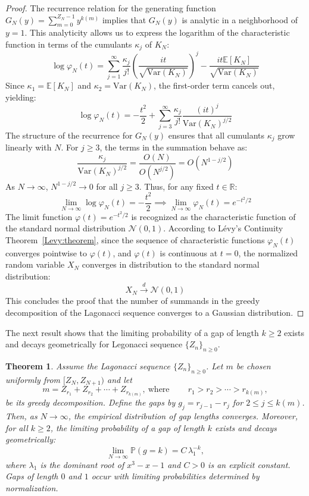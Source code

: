 \documentclass[11pt]{amsart}
\theoremstyle{plain}
\numberwithin{equation}{section} %
\newtheorem{theorem}[thm]{Theorem}
\numberwithin{table}{section} %
\numberwithin{figure}{section}
\begin{document}
\begin{proof}
		The recurrence relation for the generating function $G_N(y) = \sum_{m=0}^{Z_N-1} y^{k(m)}$ implies that $G_N(y)$ is analytic in a neighborhood of $y=1$. This analyticity allows us to express the logarithm of the characteristic function in terms of the cumulants $\kappa_j$ of $K_N$:
		\[
		\log \varphi_N(t) = \sum_{j=1}^{\infty} \frac{\kappa_j}{j!} \left( \frac{it}{\sqrt{\text{Var}(K_N)}} \right)^j - \frac{it\mathbb{E}[K_N]}{\sqrt{\text{Var}(K_N)}}
		\]
		Since $\kappa_1 = \mathbb{E}[K_N]$ and $\kappa_2 = \text{Var}(K_N)$, the first-order term cancels out, yielding:
		\[
		\log \varphi_N(t) = -\frac{t^2}{2} + \sum_{j=3}^{\infty} \frac{\kappa_j}{j!} \frac{(it)^j}{\text{Var}(K_N)^{j/2}}
		\]
		The structure of the recurrence for $G_N(y)$ ensures that all cumulants $\kappa_j$ grow linearly with $N$. For $j \geq 3$, the terms in the summation behave as:
		\[
		\frac{\kappa_j}{\text{Var}(K_N)^{j/2}} = \frac{O(N)}{O(N^{j/2})} = O(N^{1-j/2})
		\]
		As $N \to \infty$, $N^{1-j/2} \to 0$ for all $j \geq 3$. Thus, for any fixed $t \in \mathbb{R}$:
		\[
		\lim_{N \to \infty} \log \varphi_N(t) = -\frac{t^2}{2} \implies \lim_{N \to \infty} \varphi_N(t) = e^{-t^2/2}
		\]
		The limit function $\varphi(t) = e^{-t^2/2}$ is recognized as the characteristic function of the standard normal distribution $\mathcal{N}(0,1)$. According to Lévy's Continuity Theorem~\ref{Levy:theorem}, since the sequence of characteristic functions $\varphi_N(t)$ converges pointwise to $\varphi(t)$, and $\varphi(t)$ is continuous at $t=0$, the normalized random variable $X_N$ converges in distribution to the standard normal distribution:
		\[
		X_N \xrightarrow{d} \mathcal{N}(0,1)
		\]
		This concludes the proof that the number of summands in the greedy decomposition of the Lagonacci sequence converges to a Gaussian distribution.
	\end{proof}
	
	
	The next result shows that  the limiting probability of a gap of length $k\ge2$
	exists and decays geometrically for Legonacci sequence $\{ Z_n\}_{n\geq 0}$.
	
	
	\begin{theorem}
		\label{thm:Gaps}
		Assume the   Lagonacci sequence   $\{Z_n\}_{n\ge0}$.
		Let $m$ be chosen uniformly from $[Z_N,Z_{N+1})$ and let
		\[
		m=Z_{r_1}+Z_{r_2}+\cdots+Z_{r_{k(m)}}, \ \textrm{where} \
		\qquad r_1>r_2>\cdots> r_{k(m)},
		\]
		be its greedy decomposition.
		Define the gaps by $g_j=r_{j-1}-r_j$ for $2\le j\le k(m)$.
		Then, as $N\to\infty$, the empirical distribution of gap lengths converges.
		Moreover, for all $k\ge2$, the limiting probability of a gap of length $k$
		exists and decays geometrically:
		\[
		\lim_{N\to\infty}\mathbb{P}(g=k)=C\,\lambda_1^{-k},
		\]
		where $\lambda_1$ is the dominant root of $x^3-x-1$ and $C>0$ is an explicit
		constant. Gaps of length $0$ and $1$ occur with limiting probabilities
		determined by normalization.
	\end{theorem}
	
\end{document}
